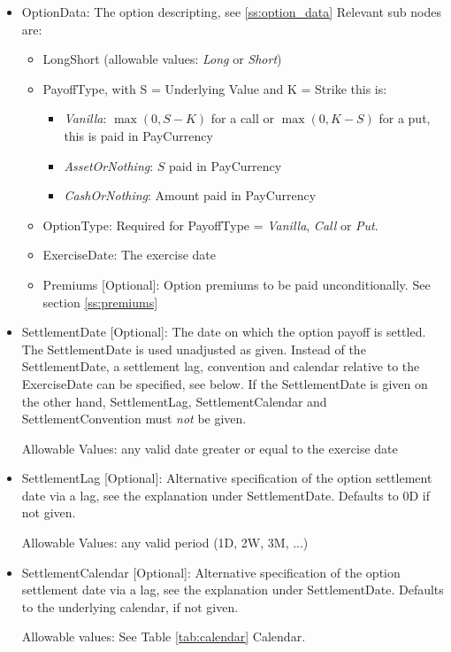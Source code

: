 \begin{itemize}
\item OptionData: The option descripting, see \ref{ss:option_data} Relevant sub nodes are:
  \begin{itemize}
    \item LongShort (allowable values: \emph{Long} or  \emph{Short})
    \item PayoffType, with S = Underlying Value and K = Strike this is:
      \begin{itemize}
      \item \emph{Vanilla}: $\max(0, S-K)$ for a call or $\max(0, K-S)$ for a put, this is paid in PayCurrency
      \item \emph{AssetOrNothing}: $S$ paid in PayCurrency
      \item \emph{CashOrNothing}: Amount paid in PayCurrency
      \end{itemize}
    \item OptionType: Required for PayoffType = \emph{Vanilla}, \emph{Call} or \emph{Put}.
    \item ExerciseDate: The exercise date
    \item Premiums [Optional]: Option premiums to be paid unconditionally. See section \ref{ss:premiums}
  \end{itemize}

\item SettlementDate [Optional]: The date on which the option payoff is settled. The SettlementDate is used unadjusted
  as given. Instead of the SettlementDate, a settlement lag, convention and calendar relative to the ExerciseDate can be
  specified, see below. If the SettlementDate is given on the other hand, SettlementLag, SettlementCalendar and
  SettlementConvention must {\em not} be given.

  Allowable Values: any valid date greater or equal to the exercise date

\item SettlementLag [Optional]: Alternative specification of the option settlement date via a lag, see the explanation
  under SettlementDate. Defaults to 0D if not given.

  Allowable Values: any valid period (1D, 2W, 3M, ...)

\item SettlementCalendar [Optional]: Alternative specification of the option settlement date via a lag, see the
  explanation under SettlementDate. Defaults to the underlying calendar, if not given.

  Allowable values: See Table \ref{tab:calendar} Calendar.


\end{itemize}
